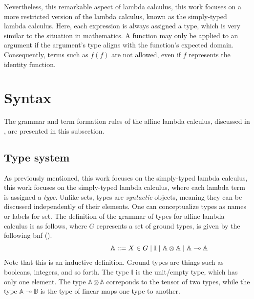 Nevertheless, this remarkable aspect of lambda calculus, this work focuses on a more restricted version of the lambda calculus, known as the simply-typed lambda calculus. Here, each expression is always assigned a type, which is very similar to the situation in mathematics. A function may only be applied to an argument if the argument's type aligns with the function's expected domain. Consequently, terms such as $f(f)$ are not allowed, even if $f$ represents the identity function.





\section{Syntax}

The grammar and term formation rules of the affine lambda calculus, discussed in \cite{dahlqvist2022syntactic}, are presented in this subsection.

\subsection{Type system}

As previously mentioned, this work focuses on the simply-typed lambda calculus, this work focuses on the simply-typed lambda calculus, where each lambda term is assigned a \emph{type}. Unlike sets, types are \emph{syntactic} objects, meaning they can be discussed independently of their elements. One can conceptualize types as names or labels for set. The definition of the grammar of types for affine lambda calculus is as follows, where $G$ represents a set of ground types, is given by the following \acrlong{bnf} (\cite{backus1960report}).
\begin{equation} \label{eq:grammartypes}
\centering
\hspace{95pt} \mathbb{A} ::= X \in G \hspace{3 pt} \vert \hspace{3 pt} \mathbb{I}  \hspace{3 pt}  \vert \hspace{3 pt} \mathbb{A}  \otimes  \mathbb{A} \hspace{3 pt} \vert  \hspace{3 pt}  \mathbb{A} \multimap  \mathbb{A}
\end{equation}
Note that this is an inductive definition. Ground types are things such as booleans, integers, and so forth. The type $\mathbb{I}$ is the unit/empty type, which has only one element. The type $\mathbb{A} \otimes \mathbb{A}$ correponds to the tensor of two types, while the type $\mathbb{A} \multimap \mathbb{B}$ is the type of linear maps one type to another.


